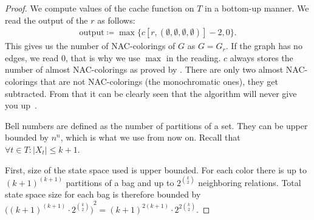 %
%
\begin{proof}
	We compute values of the cache function on \( T \) in a bottom-up manner.
	We read the output of the \RootNode{} \( r \) as follows:
	\begin{align*}
		\text{output} \coloneqq \max\{c[r, (\emptyset,\emptyset,\emptyset,\emptyset)] - 2, 0\}.
	\end{align*}
	This gives us the number of NAC-colorings of \( G \) as \( G = G_r \).
	If the graph has no edges, we read \( 0 \), that is why we use \( \max{} \) in the reading.
	\( c \) always stores the number of almost NAC-colorings as proved by
	.
	There are only two almost NAC-colorings
	that are not NAC-colorings (the monochromatic ones), they get subtracted.
	From that it can be clearly seen that the algorithm
	will never give you up~\cite{never_gonna_give_you_up}.

	Bell numbers are defined as the number of partitions of a set.
	They can be upper bounded by \( n^n \), which is what we use from now on.
	Recall that \( \forall t \in T : |X_t| \le k+1 \).

	First, size of the state space used is upper bounded.
	For each color there is up to \( {(k+1)}^{(k+1)} \) partitions of a bag and
	up to \( 2^{\binom{k}{2}} \) neighboring relations.
	Total state space size for each bag is therefore bounded by
	\( {\big({(k+1)}^{(k+1)} \cdot 2^{\binom{k}{2}} \big)}^2 = {(k+1)}^{2(k+1)} \cdot 2^{2 \binom{k}{2}} \).


\end{proof}
